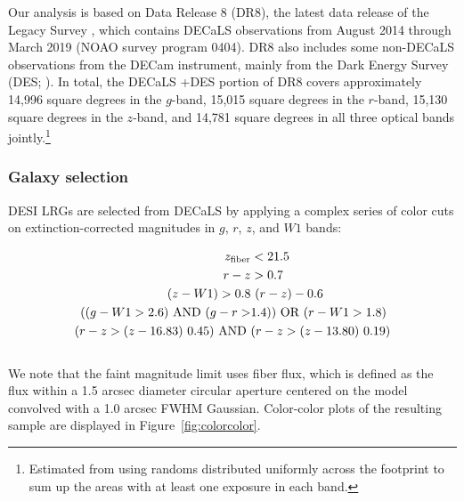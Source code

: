 \documentclass[a4paper,usenatbib]{mnras}
\begin{document}
Our analysis is based on Data Release 8 (DR8), the latest data release of the Legacy Survey \citep{Dey18}, which contains DECaLS observations from August 2014 through March 2019 (NOAO survey program 0404). DR8 also includes some non-DECaLS observations from the DECam instrument, mainly from the Dark Energy Survey (DES; \citealt{DES05}). In total, the DECaLS +DES portion of DR8 covers approximately 14,996 square degrees in the $g$-band, 15,015 square degrees in the $r$-band, 15,130 square degrees in the $z$-band, and 14,781 square degrees in all three optical bands jointly.\footnote{Estimated from using randoms distributed uniformly across the footprint to sum up the areas with at least one exposure in each band.} 

\subsubsection{Galaxy selection}\label{sec:data:ts}

DESI LRGs are selected from DECaLS by applying a complex series of color cuts on extinction-corrected magnitudes in $g$, $r$, $z$, and $W1$ bands:

\begin{equation}
\begin{split}
z_{\rm fiber} &< 21.5 \\ %
r - z &> 0.7 \\ %
(z - W1) > 0.8 &\ (r - z) - 0.6 \\ %
((g - W1 > 2.6) \text{ AND } (g - r > &1.4)) \text{ OR } (r - W1 > 1.8) \\ %
(r - z > (z - 16.83) \ 0.45) \text{ AND } &(r - z > (z - 13.80) \ 0.19) \\%
\end{split}
\end{equation} \\ 
We note that the faint magnitude limit uses fiber flux, which is defined as the flux within a 1.5 arcsec diameter circular aperture centered on the model convolved with a 1.0 arcsec FWHM Gaussian. Color-color plots of the resulting sample are displayed in Figure~\ref{fig:colorcolor}.
%
\end{document}

